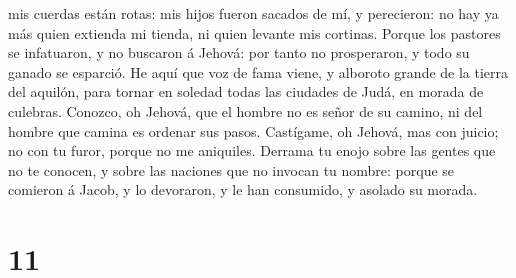 mis cuerdas están rotas: mis hijos fueron sacados de mí, y perecieron:
no hay ya más quien extienda mi tienda, ni quien levante mis cortinas.
 Porque los pastores se infatuaron, y no buscaron á
Jehová: por tanto no prosperaron, y todo su ganado se esparció.
 He aquí que voz de fama viene, y alboroto grande de la
tierra del aquilón, para tornar en soledad todas las ciudades de Judá,
en morada de culebras.  Conozco, oh Jehová, que el hombre
no es señor de su camino, ni del hombre que camina es ordenar sus pasos.
 Castígame, oh Jehová, mas con juicio; no con tu furor,
porque no me aniquiles.  Derrama tu enojo sobre las
gentes que no te conocen, y sobre las naciones que no invocan tu nombre:
porque se comieron á Jacob, y lo devoraron, y le han consumido, y
asolado su morada.

\hypertarget{section-10}{%
\section{11}\label{section-10}}


